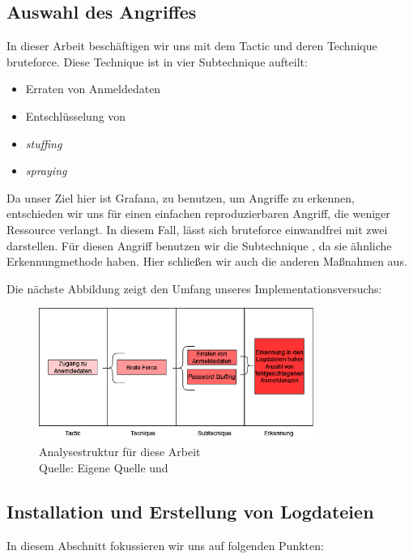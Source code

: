 \subsection{Auswahl des Angriffes}
In dieser Arbeit beschäftigen wir uns mit dem Tactic  und deren Technique \gls{bruteforce}. Diese Technique ist in vier Subtechnique aufteilt:

{
\begin{itemize}[noitemsep]
   \item Erraten von Anmeldedaten 
   \item	Entschlüsselung von 
   \item \textit{\gls{stuffing}}
   \item \textit{\gls{spraying}}
\end{itemize}
}

Da unser Ziel hier ist Grafana, zu benutzen, um Angriffe zu erkennen, entschieden wir uns für einen einfachen reproduzierbaren Angriff, die weniger Ressource verlangt. In diesem Fall, lässt sich \gls{bruteforce} einwandfrei mit zwei  darstellen. Für diesen Angriff benutzen wir die Subtechnique , da sie ähnliche Erkennungmethode haben. Hier schließen wir auch die anderen Maßnahmen aus.

Die nächste Abbildung zeigt den Umfang unseres Implementationsversuchs:
\begin{figure}[H]
   \centering
   \includegraphics[width=0.8\textwidth]{assets/T1110.drawio.png}
   \caption{Analysestruktur für diese Arbeit  \\Quelle: Eigene Quelle und \citep{Mitre_t1110}}
   \centering
\end{figure}

\subsection{Installation und Erstellung von Logdateien}
In diesem Abschnitt fokussieren wir uns auf folgenden Punkten:

